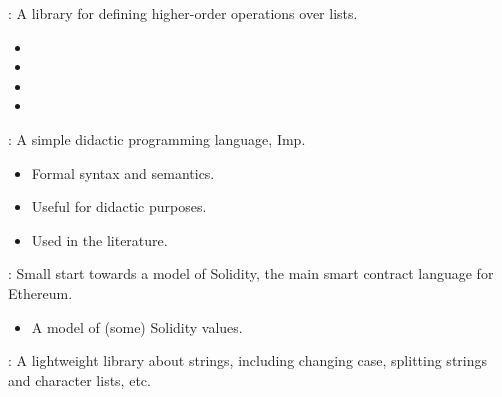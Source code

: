 
\begin{frame}

\newlibtitle

:
A library for defining higher-order operations over lists.
\begin{itemize}
\item {}
\item {}
\item {}
\item {}
\end{itemize}
\end{frame}


\begin{frame}

\newlibtitle

:
A simple didactic programming language, Imp.
\begin{itemize}
\item Formal syntax and semantics.
\item Useful for didactic purposes.
\item Used in the literature.
\end{itemize}

\end{frame}


\begin{frame}

\newlibtitle

:
Small start towards a model of Solidity,
the main smart contract language for Ethereum.
\begin{itemize}
\item A model of (some) Solidity values.
\end{itemize}

\end{frame}


\begin{frame}

\newlibtitle

:
A lightweight library about strings, including changing case,
splitting strings and character lists, etc.

\end{frame}

